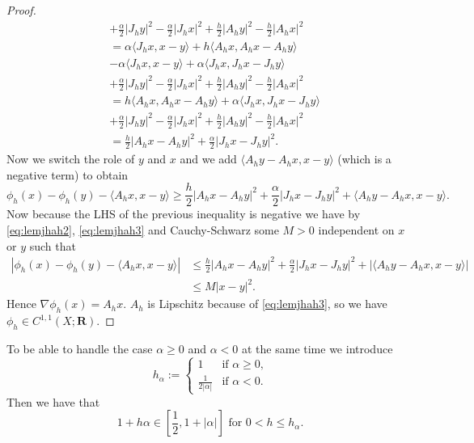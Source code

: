 \documentclass[a4paper,11pt, leqno]{scrreprt} %
\renewcommand{\leq}{\leqslant}
\renewcommand{\leq}{\leqslant}
\renewcommand{\geq}{\geqslant}
\newcommand{\R}{\mathbf R}
\theoremstyle{change}
\theoremstyle{nonumberplain}
\newtheorem{proof}{Proof}
\begin{document}
\begin{proof}
\begin{align*}
&+ \frac{\alpha}2
|J_h y|^2 - \frac{\alpha}2 |J_h x|^2 + \frac{h}2 |A_h y|^2 - \frac{h}2
|A_h x|^2\\
&=\alpha \langle J_h x, x - y\rangle + h \langle A_h x, A_h x - A_h y
\rangle\\
&- \alpha \langle J_h x, x - y \rangle + \alpha \langle J_h x,
J_h x - J_h y \rangle\\
&+ \frac{\alpha}2
|J_h y|^2 - \frac{\alpha}2 |J_h x|^2 + \frac{h}2 |A_h y|^2 - \frac{h}2
|A_h x|^2\\
&= h \langle A_h x, A_h x - A_h y
\rangle + \alpha \langle J_h x,
J_h x - J_h y \rangle\\
&+ \frac{\alpha}2
|J_h y|^2 - \frac{\alpha}2 |J_h x|^2 + \frac{h}2 |A_h y|^2 - \frac{h}2
|A_h x|^2\\
&= \frac{h}2 |A_h x - A_h y|^2 + \frac{\alpha}2 |J_h x - J_h y|^2.
\end{align*}
Now we switch the role of $y$ and $x$ and we add $\langle A_h y - A_h
x, x - y \rangle$ (which is a negative term) to obtain
\begin{equation}\label{eq:myexistence}
\phi_h(x) - \phi_h(y) - \langle A_h x, x - y \rangle \geq \frac{h}2
|A_h x - A_h y|^2 + \frac{\alpha}2 |J_h x - J_h y|^2 + \langle A_h y - A_h
x, x - y \rangle.
\end{equation}
Now because the LHS of the previous inequality is negative we have by
\eqref{eq:lemjhah2}, \eqref{eq:lemjhah3} and Cauchy-Schwarz some $M
> 0$ independent on $x$ or $y$ such that
\begin{equation}
\begin{split}
|\phi_h(x) - \phi_h(y) - \langle A_h x, x - y \rangle| &\leq \frac{h}2
|A_h x - A_h y|^2 + \frac{\alpha}2 |J_h x - J_h y|^2 + |\langle A_h y - A_h
x, x - y \rangle|\\
&\leq M |x - y|^2.
\end{split}
\end{equation}
Hence $\nabla \phi_h(x) = A_h x$. $A_h$ is Lipschitz because of
\eqref{eq:lemjhah3}, so we have $\phi_h \in C^{1,1}(X; \R)$.
\end{proof}
To be able to handle the case $\alpha \geq 0$ and $\alpha < 0$ at the
same time we introduce
\begin{equation}
  h_\alpha:=
  \begin{cases}
    1 &\text{if $\alpha \geq 0$,}\\
    \frac1{2|\alpha|} &\text{if $\alpha < 0$}.
  \end{cases}
\end{equation}
Then we have that
\begin{equation}\label{eq:halphainterval}
  1 + h \alpha \in \left [\frac12, 1 + |\alpha| \right ] \text{ for $0
    < h \leq h_\alpha$}.
\end{equation}
\end{document}
